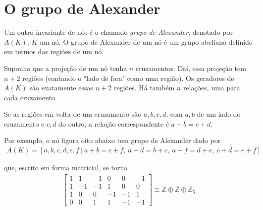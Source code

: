 	\section{O grupo de Alexander}
	\hspace{12pt} Um outro invariante de nós é o chamado \textit{grupo de Alexander}, denotado por $A(K)$, $K$ um nó. O grupo de Alexander de um nó é um grupo abeliano definido em termos das regiões de um nó.
	\par\vspace{0.3cm} Suponha que a projeção de um nó tenha $n$ cruzamentos. Daí, essa projeção tem $n+2$ regiões (contando o "lado de fora" como uma região). Os geradores de $A(K)$ são exatamente essas $n+2$ regiões. Há também $n$ relações, uma para cada cruzamento.
	\par\vspace{0.3cm} Se as regiões em volta de um cruzamento são $a,b,c,d$, com $a,b$ de um lado do cruzamento e $c,d$ do outro, a relação correspondente é $a+b=c+d$.
	\par\vspace{0.3cm} Por exemplo, o nó figura oito abaixo tem grupo de Alexander dado por 
	\begin{align*}
	A(K) = [a,b,c,d,e,f \ \vert \ a+b=c+f,\ a+d=b+c,\ a+f=d+e,\ c+d=e+f] 
	\end{align*}
	\par\vspace{0.3cm} que, escrito em forma matricial, se torna
	\begin{align*}
	\begin{bmatrix}
	1 & 1 & -1 & 0 & 0 & -1 \\
	1 & -1 & -1 & 1 & 0 & 0 \\
	1 & 0 & 0 & -1 & -1 & 1 \\
	0 & 0 & 1 & 1 & -1 & -1 
	\end{bmatrix}\cong\mathbb{Z}\oplus\mathbb{Z}\oplus\mathbb{Z}_5
	\end{align*}
	

